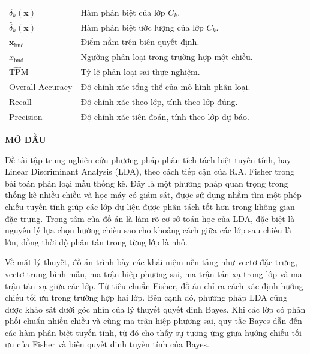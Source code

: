 \documentclass[12pt,a4paper,oneside]{report}
\begin{document}
\begin{longtable}{p{3cm}p{10cm}}
$\delta_k(\bm{x})$ & Hàm phân biệt của lớp $C_k$. \\[0.2cm]
$\hat{\delta}_k(\bm{x})$ & Hàm phân biệt ước lượng của lớp $C_k$. \\[0.2cm]

$\bm{x}_{\text{bnd}}$ & Điểm nằm trên biên quyết định. \\[0.2cm]
$x_{\text{bnd}}$ & Ngưỡng phân loại trong trường hợp một chiều. \\[0.2cm]

$\widehat{\mathrm{TPM}}$ & Tỷ lệ phân loại sai thực nghiệm. \\[0.2cm]
Overall Accuracy & Độ chính xác tổng thể của mô hình phân loại. \\[0.2cm]
Recall & Độ chính xác theo lớp, tính theo lớp đúng. \\[0.2cm]
Precision & Độ chính xác tiên đoán, tính theo lớp dự báo. \\[0.2cm]
	
\end{longtable}
\clearpage
\thispagestyle{plain}

\begin{center}
	\textbf{\fontsize{16}{18}\selectfont MỞ ĐẦU}
\end{center}

\vspace{0.5cm}
\justifying

Đề tài tập trung nghiên cứu phương pháp phân tích tách biệt tuyến tính, hay Linear Discriminant Analysis (LDA), theo cách tiếp cận của R.A. Fisher trong bài toán phân loại mẫu thống kê. Đây là một phương pháp quan trọng trong thống kê nhiều chiều và học máy có giám sát, được sử dụng nhằm tìm một phép chiếu tuyến tính giúp các lớp dữ liệu được phân tách tốt hơn trong không gian đặc trưng. Trọng tâm của đồ án là làm rõ cơ sở toán học của LDA, đặc biệt là nguyên lý lựa chọn hướng chiếu sao cho khoảng cách giữa các lớp sau chiếu là lớn, đồng thời độ phân tán trong từng lớp là nhỏ.

Về mặt lý thuyết, đồ án trình bày các khái niệm nền tảng như vectơ đặc trưng, vectơ trung bình mẫu, ma trận hiệp phương sai, ma trận tán xạ trong lớp và ma trận tán xạ giữa các lớp. Từ tiêu chuẩn Fisher, đồ án chỉ ra cách xác định hướng chiếu tối ưu trong trường hợp hai lớp. Bên cạnh đó, phương pháp LDA cũng được khảo sát dưới góc nhìn của lý thuyết quyết định Bayes. Khi các lớp có phân phối chuẩn nhiều chiều và cùng ma trận hiệp phương sai, quy tắc Bayes dẫn đến các hàm phân biệt tuyến tính, từ đó cho thấy sự tương ứng giữa hướng chiếu tối ưu của Fisher và biên quyết định tuyến tính của Bayes.
\end{document}
